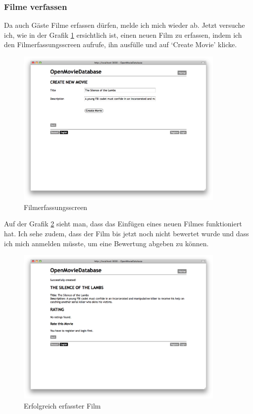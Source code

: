 \clearpage

\subsubsection{Filme verfassen}
Da auch Gäste Filme erfassen dürfen, melde ich mich wieder ab.
Jetzt versuche ich, wie in der Grafik \ref{test_movie_01} ersichtlich ist, einen neuen Film zu erfassen, 
indem ich den Filmerfassungsscreen aufrufe, ihn ausfülle und auf `Create Movie' klicke.

\begin{figure}[ht]
    \begin{center}
        \includegraphics[width=0.9\textwidth,angle=0]{./bilder/tests/test_movie_01.png}
        \caption{Filmerfassungsscreen}
        \label{test_movie_01}
    \end{center}
\end{figure}

Auf der Grafik \ref{test_movie_02} sieht man, dass das Einfügen eines neuen
Filmes funktioniert hat. Ich sehe zudem, dass der Film bis jetzt noch nicht
bewertet wurde und dass ich mich anmelden müsste, um eine Bewertung abgeben zu
können.

\begin{figure}[ht]
    \begin{center}
        \includegraphics[width=0.9\textwidth,angle=0]{./bilder/tests/test_movie_02.png}
        \caption{Erfolgreich erfasster Film}
        \label{test_movie_02}
    \end{center}
\end{figure}

